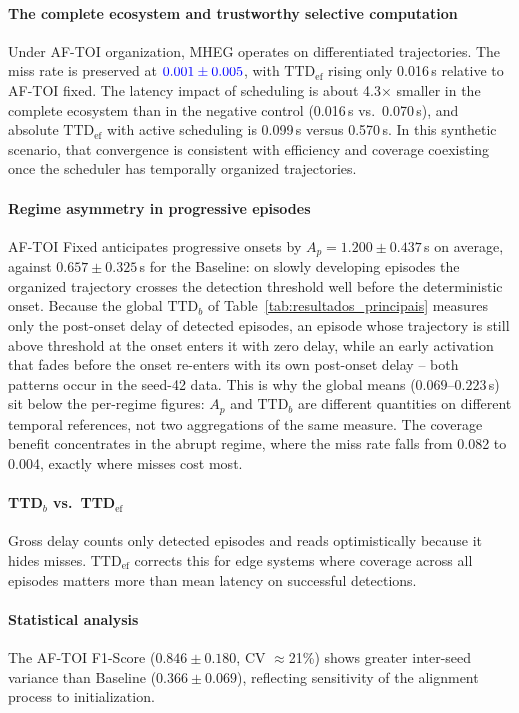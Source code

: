 \documentclass[a4paper,fleqn]{cas-dc}
\newcommand{\AFTOI}{\mbox{AF-TOI}\xspace}
\newcommand{\MHEG}{\mbox{MHEG}\xspace}
\begin{document}
\paragraph{The complete ecosystem and trustworthy selective computation}
Under \AFTOI organization, \MHEG operates on differentiated trajectories. The
miss rate is preserved at ${\color{blue}0.001 \pm 0.005}$, with
$\mathrm{TTD}_{\mathrm{ef}}$ rising only {\color{\revcolor}0.016}\,s relative to \AFTOI fixed. The
latency impact of scheduling is about {\color{\revcolor}4.3}$\times$ smaller in the complete
ecosystem than in the negative control {\color{\revcolor}(0.016\,s vs.\ 0.070\,s)}, and absolute
$\mathrm{TTD}_{\mathrm{ef}}$ with active scheduling is {\color{\revcolor}0.099\,s versus 0.570\,s}.
In this synthetic scenario, that convergence is consistent with efficiency and
coverage coexisting once the scheduler has temporally organized trajectories.
\paragraph{Regime asymmetry in progressive episodes}
{\color{\revcolor}\AFTOI Fixed anticipates progressive onsets by
$A_p = 1.200 \pm 0.437$\,s on average, against $0.657 \pm 0.325$\,s for the
Baseline: on slowly developing episodes the organized trajectory crosses the
detection threshold well before the deterministic onset. Because the global
$\text{TTD}_b$ of Table~\ref{tab:resultados_principais} measures only the
post-onset delay of detected episodes, an episode whose trajectory is still
above threshold at the onset enters it with zero delay, while an early
activation that fades before the onset re-enters with its own post-onset
delay -- both patterns occur in the seed-42 data. This is why the global
means ($0.069$--$0.223$\,s) sit below the per-regime figures: $A_p$ and
$\text{TTD}_b$ are different quantities on different temporal references,
not two aggregations of the same measure. The coverage benefit concentrates
in the abrupt regime, where the miss rate falls from 0.082 to 0.004, exactly
where misses cost most.}
\paragraph{TTD$_b$ vs.\ TTD$_{\mathrm{ef}}$}
Gross delay counts only detected episodes and reads optimistically because it
hides misses. $\mathrm{TTD}_{\mathrm{ef}}$ corrects this for edge systems where
coverage across all episodes matters more than mean latency on successful
detections.
\paragraph{Statistical analysis}
The \AFTOI F1-Score ({\color{\revcolor}$0.846 \pm 0.180$, CV $\approx$21\%}) shows greater
inter-seed variance than Baseline ({\color{\revcolor}$0.366 \pm 0.069$}), reflecting sensitivity of
the alignment process to initialization.
\end{document}
